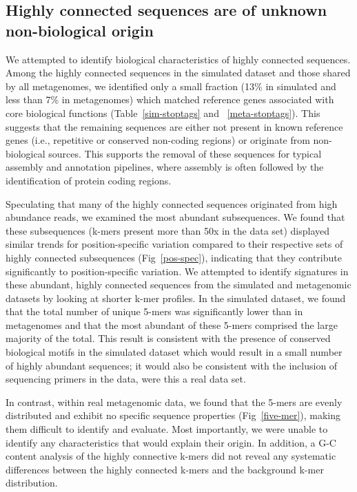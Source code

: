 \documentclass[10pt]{article}
\begin{document}
\subsection*{Highly connected sequences are of unknown non-biological origin}

We attempted to identify biological characteristics of highly
connected sequences.  Among the highly connected sequences in the
simulated dataset and those shared by all metagenomes, we identified
only a small fraction (13\% in simulated and less than 7\% in
metagenomes) which matched reference genes associated with core
biological functions (Table~\ref{sim-stoptags} and
~\ref{meta-stoptags}).  This suggests that the remaining sequences are
either not present in known reference genes (i.e., repetitive or
conserved non-coding regions) or originate from non-biological
sources.  This supports the removal of these sequences for typical
assembly and annotation pipelines, where assembly is often followed by
the identification of protein coding regions.

Speculating that many of the highly connected sequences originated
from high abundance reads, we examined the most abundant subsequences.
We found that these subsequences (k-mers present more than 50x in the data set) displayed
similar trends for position-specific variation compared to their
respective sets of highly connected subsequences (Fig~\ref{pos-spec}),
indicating that they contribute significantly to position-specific
variation.  We attempted to identify signatures in these abundant,
highly connected sequences from the simulated and metagenomic datasets by
looking at shorter k-mer profiles.
In the simulated dataset, we found that the total number of unique
5-mers was significantly lower than in metagenomes and that the
most abundant of these 5-mers comprised the large majority of the
total.  This result is consistent with the presence of conserved
biological motifs in the simulated dataset which would result in a
small number of highly abundant sequences; it would also be consistent
with the inclusion of sequencing primers in the data, were this a real
data set.

In contrast, within real metagenomic data, we found that the 5-mers
are evenly distributed and exhibit no specific sequence properties
(Fig~\ref{five-mer}), making them difficult to identify and evaluate.
Most importantly, we were unable to identify any characteristics that
would explain their origin.  In addition, a G-C content analysis of
the highly connective k-mers did not reveal any systematic differences
between the highly connected k-mers and the background k-mer
distribution.
\end{document}

